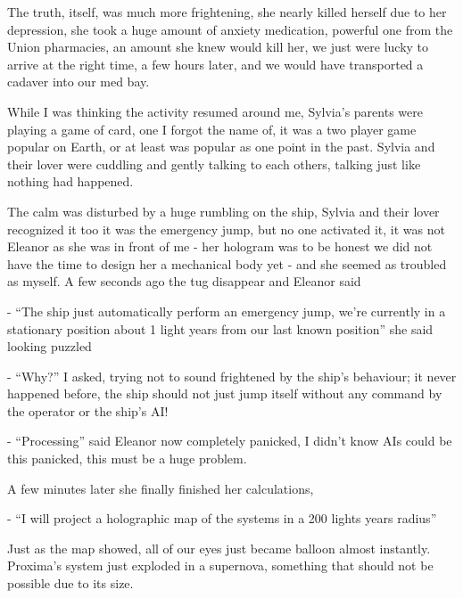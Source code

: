 \documentclass[colorlinks,12pt,a4paper]{book}
\begin{document}
 The truth, itself, was much more frightening, she nearly killed herself due to her depression, she took a huge amount 
 of anxiety medication, powerful one from the Union pharmacies, an amount she knew would kill her, we just were lucky to 
 arrive at the right time, a few hours later, and we would have transported a cadaver into our med bay.\par
 \bigskip
 
 While I was thinking the activity resumed around me, Sylvia's parents were playing a game of card, one I forgot the 
 name of, it was a two player game popular on Earth, or at least was popular as one point in the past. Sylvia and their
  lover were cuddling and gently talking to each others, talking just like nothing had happened.\par
  \bigskip
 
 The calm was disturbed by a huge rumbling on the ship, Sylvia and their lover recognized it too it was the emergency 
 jump, but no one activated it, it was not Eleanor as she was in front of me - her hologram was to be honest 
 we did not have the time to design her a mechanical body yet - and she seemed as troubled as myself. A few seconds 
 ago the tug disappear and Eleanor said\par
 \bigskip
 
 - “The ship just automatically perform an emergency jump, we're currently in a stationary position about 1 light years 
 from our last known position” she said looking puzzled\par
 \bigskip
 
 - “Why?” I asked, trying not to sound frightened by the ship's behaviour; it never happened before, the ship should 
 not just jump itself without any command by the operator or the ship's AI!\par
 \bigskip
 
 - “Processing” said Eleanor now completely panicked, I didn't know AIs could be this panicked, this must be a 
 huge problem.\par
 \bigskip
 
 A few minutes later she finally finished her calculations, \par
 \bigskip
 
 - “I will project a holographic map of the systems in a 200 lights years radius”\par
 \bigskip
 
 Just as the map showed, all of our eyes just became balloon almost instantly. 
 Proxima's system just exploded in a supernova, something that should not be possible due to its size.\par
 \bigskip
 
\end{document}
